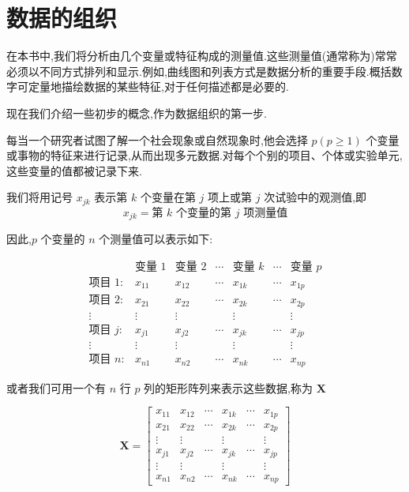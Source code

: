 \section{数据的组织}
\label{sec:1.3}

在本书中,我们将分析由几个变量或特征构成的测量值.这些测量值(通常称为)常常必须以不同方式排列和显示.例如,曲线图和列表方式是数据分析的重要手段.概括数字可定量地描绘数据的某些特征,对于任何描述都是必要的.

现在我们介绍一些初步的概念,作为数据组织的第一步.


每当一个研究者试图了解一个社会现象或自然现象时,他会选择 $p(p\geqslant 1)$ 个变量或事物的特征来进行记录,从而出现多元数据.对每个个别的项目、个体或实验单元,这些变量的值都被记录下来.

我们将用记号 $x_{jk}$ 表示第 $k$ 个变量在第 $j$ 项上或第 $j$ 次试验中的观测值,即
\[
x_{jk} = \text{第 }k\text{ 个变量的第 }j\text{ 项测量值}
\]

因此,$p$ 个变量的 $n$ 个测量值可以表示如下:

\[
\begin{array}{ccccccc}
 & \text{变量 }1 & \text{变量 }2 & \cdots & \text{变量 }k & \cdots & \text{变量 }p \\[2pt]
\text{项目 }1: & x_{11} & x_{12} & \cdots & x_{1k} & \cdots & x_{1p} \\[2pt]
\text{项目 }2: & x_{21} & x_{22} & \cdots & x_{2k} & \cdots & x_{2p} \\[2pt]
\vdots & \vdots & \vdots & & \vdots & & \vdots \\[2pt]
\text{项目 }j: & x_{j1} & x_{j2} & \cdots & x_{jk} & \cdots & x_{jp} \\[2pt]
\vdots & \vdots & \vdots & & \vdots & & \vdots \\[2pt]
\text{项目 }n: & x_{n1} & x_{n2} & \cdots & x_{nk} & \cdots & x_{np}
\end{array}
\]

或者我们可用一个有 $n$ 行 $p$ 列的矩形阵列来表示这些数据,称为 $\bm{X}$

\[
\bm{X} =
\begin{bmatrix}
x_{11} & x_{12} & \cdots & x_{1k} & \cdots & x_{1p} \\
x_{21} & x_{22} & \cdots & x_{2k} & \cdots & x_{2p} \\
\vdots & \vdots & & \vdots & & \vdots \\
x_{j1} & x_{j2} & \cdots & x_{jk} & \cdots & x_{jp} \\
\vdots & \vdots & & \vdots & & \vdots \\
x_{n1} & x_{n2} & \cdots & x_{nk} & \cdots & x_{np}
\end{bmatrix}
\]

